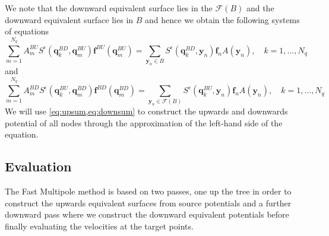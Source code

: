 We note that the downward equivalent surface lies in the $\mathcal{F}(B)$ and the downward equivalent surface lies in $B$ and hence we obtain the following systems of equations
\begin{equation}
\label{eq:upsum}
    \sum_{m=1}^{N_{q}} A_{m}^{BU} S^\epsilon\left(\bm{q}^{BD}_{k}, \bm{q}_{m}^{B U}\right) \bm{f}^{B U}\left(\bm{q}_{m}^{B U}\right)=\sum_{{\bm{y}}_{n} \in B} S^\epsilon\left(\bm{q}^{BD}_{k}, {\bm{y}}_{n}\right) {\bm{f}}_{n} A({\bm{y}}_n), \quad k=1,\dots,N_q
\end{equation}
and
\begin{equation}
\label{eq:downsum}
    \sum_{m=1}^{N_{q}} A_{m}^{BD} S^\epsilon\left(\bm{q}^{BU}_{k}, \bm{q}_{m}^{B D}\right) \bm{f}^{B D}\left(\bm{q}_{m}^{B D}\right)=\sum_{{\bm{y}}_{n} \in \mathcal{F}(B)} S^\epsilon\left(\bm{q}^{BU}_{k}, {\bm{y}}_{n}\right) {\bm{f}}_{n} A({\bm{y}}_n), \quad k=1,\dots,N_q
\end{equation}
We will use \cref{eq:upsum,eq:downsum} to construct the upwards and downwards potential of all nodes through the approximation of the left-hand side of the equation.

\subsection{Evaluation}
The Fast Multipole method is based on two passes, one up the tree in order to construct the upwards equivalent surfaces from source potentials and a further downward pass where we construct the downward equivalent potentials before finally evaluating the velocities at the target points.

